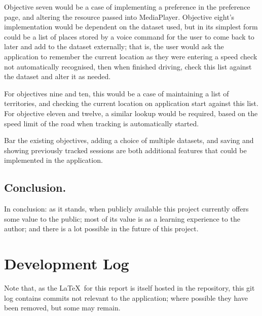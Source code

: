 \documentclass[11pt, a4paper, notitlepage]{report}
\begin{document}
Objective seven would be a case of implementing a preference in the preference page, and altering the resource passed into MediaPlayer. Objective eight's implementation would be dependent on the dataset used, but in its simplest form could be a list of places stored by a voice command for the user to come back to later and add to the dataset externally; that is, the user would ask the application to remember the current location as they were entering a speed check not automatically recognised, then when finished driving, check this list against the dataset and alter it as needed.

For objectives nine and ten, this would be a case of maintaining a list of territories, and checking the current location on application start against this list. For objective eleven and twelve, a similar lookup would be required, based on the speed limit of the road when tracking is automatically started.

Bar the existing objectives, adding a choice of multiple datasets, and saving and showing previously tracked sessions are both additional features that could be implemented in the application.

\section{Conclusion.}
In conclusion: as it stands, when publicly available this project currently offers some value to the public; most of its value is as a learning experience to the author; and there is a lot possible in the future of this project.

\appendix
\chapter{Development Log}\label{app:GitLog}
Note that, as the \LaTeX\ for this report is itself hosted in the repository, this git log contains commits not relevant to the application; where possible they have been removed, but some may remain. 
\end{document}
